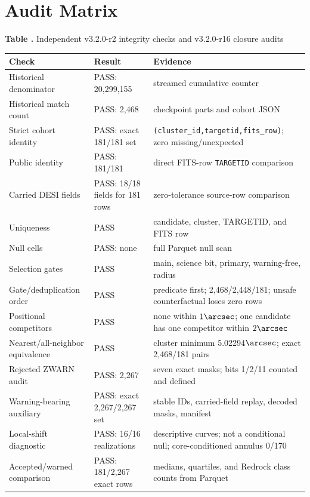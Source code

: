 \documentclass[twocolumn,linenumbers]{aastex702}
\newcommand{\paperVersion}{v3.2.0-r16}
\newcommand{\releaseVersion}{v3.2.0-r2}
\begin{document}
\section{Audit Matrix}\label{app:audit}

\label{tab:audit}
\begin{center}
\textbf{Table \thetable.} Independent \releaseVersion{} integrity checks and \paperVersion{} closure audits

\smallskip
\scriptsize
\begin{tabular}{p{}p{}p{}}
\toprule
Check & Result & Evidence \\
\midrule
Historical denominator & PASS: 20,299,155 & streamed cumulative counter \\
Historical match count & PASS: 2,468 & checkpoint parts and cohort JSON \\
Strict cohort identity & PASS: exact 181/181 set & \texttt{(cluster\_id,targetid,fits\_row)}; zero missing/unexpected \\
Public identity & PASS: 181/181 & direct FITS-row \texttt{TARGETID} comparison \\
Carried DESI fields & PASS: 18/18 fields for 181 rows & zero-tolerance source-row comparison \\
Uniqueness & PASS & candidate, cluster, TARGETID, and FITS row \\
Null cells & PASS: none & full Parquet null scan \\
Selection gates & PASS & main, science bit, primary, warning-free, radius \\
Gate/deduplication order & PASS & predicate first; 2,468/2,448/181; unsafe counterfactual loses zero rows \\
Positional competitors & PASS & none within $1\arcsec$; one candidate has one competitor within $2\arcsec$ \\
Nearest/all-neighbor equivalence & PASS & cluster minimum 5.02294$\arcsec$; exact 2,468/181 pairs \\
Rejected ZWARN audit & PASS: 2,267 & seven exact masks; bits 1/2/11 counted and defined \\
Warning-bearing auxiliary & PASS: exact 2,267/2,267 set & stable IDs, carried-field replay, decoded masks, manifest \\
Local-shift diagnostic & PASS: 16/16 realizations & descriptive curves; not a conditional null; core-conditioned annulus 0/170 \\
Accepted/warned comparison & PASS: 181/2,267 exact rows & medians, quartiles, and Redrock class counts from Parquet \\

\end{tabular}
\end{center}
\end{document}
